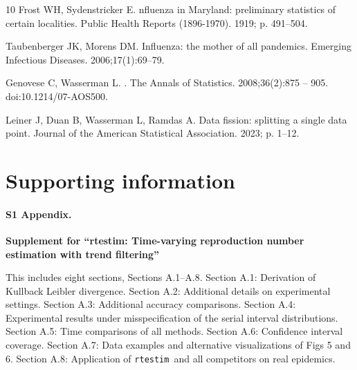 \documentclass[10pt,letterpaper]{article}
\def\RtEstim{\texttt{rtestim}}
\begin{document}
\begin{thebibliography}{10}
  Frost WH, Sydenstricker E.
  nfluenza in {M}aryland: preliminary statistics of certain
    localities.
  \newblock Public Health Reports (1896-1970). 1919; p. 491--504.
  
  Taubenberger JK, Morens DM.
   {I}nfluenza: the mother of all pandemics.
  \newblock Emerging Infectious Diseases. 2006;17(1):69--79.
  
  Genovese C, Wasserman L.
  .
  \newblock The Annals of Statistics. 2008;36(2):875 -- 905.
  \newblock doi:{10.1214/07-AOS500}.
  
  Leiner J, Duan B, Wasserman L, Ramdas A.
  \newblock Data fission: splitting a single data point.
  \newblock Journal of the American Statistical Association. 2023; p. 1--12.
  
\end{thebibliography}  
 

\section*{Supporting information}

\paragraph*{S1 Appendix.}
\label{S1_supp}

{\bf Supplement for ``rtestim: Time-varying reproduction number estimation with
trend filtering''} 

This includes eight sections, Sections A.1--A.8. Section A.1: Derivation of Kullback Leibler divergence.
Section A.2: Additional details on experimental settings.
Section A.3: Additional accuracy comparisons.
Section A.4: Experimental results under misspecification of the serial interval distributions.
Section A.5: Time comparisons of all methods.
Section A.6: Confidence interval coverage.
Section A.7: Data examples and alternative visualizations of Figs 5 and 6.
Section A.8: Application of \RtEstim\ and all competitors on real epidemics.
\end{document}
